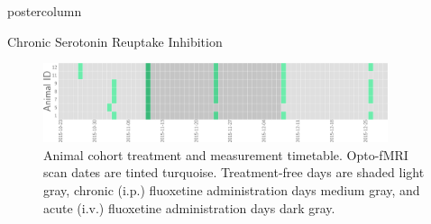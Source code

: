 \documentclass{beamer}
\begin{document}
\begin{frame}
\begin{columns}
\begin{column}{.48\textwidth}
\begin{beamercolorbox}[center]{postercolumn}
{\begin{myblock}{Chronic Serotonin Reuptake Inhibition}
						\vspace{0.5em}
						\begin{figure}
							\begin{minipage}{0.94\textwidth}
								\centering\includegraphics[width=0.9\textwidth]{img/tt.png}
								\caption{Animal cohort treatment and measurement timetable.
										Opto-fMRI scan dates are tinted turquoise.
										Treatment-free days are shaded light gray, chronic (i.p.)
										fluoxetine administration days medium gray, and acute
										(i.v.) fluoxetine administration days dark gray.}
								\label{fig:tt}
							\end{minipage}
						\end{figure}
						

\end{myblock}}
\end{beamercolorbox}
\end{column}
\end{columns}
\end{frame}
\end{document}
